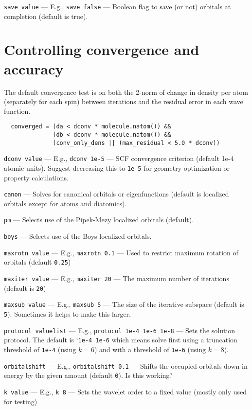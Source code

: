 \documentclass[letterpaper]{book}
\begin{document}
{\tt save value} --- E.g., {\tt save false} --- Boolean flag to save (or not) orbitals at completion (default is true).

\section{Controlling convergence and accuracy}

The default convergence test is on both the 2-norm of change in density per atom (separately for each spin) between iterations and the residual error in each wave function.

\begin{verbatim}
  converged = (da < dconv * molecule.natom()) && 
              (db < dconv * molecule.natom()) &&
              (conv_only_dens || (max_residual < 5.0 * dconv))
\end{verbatim}

{\tt dconv value} --- E.g., {\tt dconv 1e-5} --- SCF convergence criterion (default 1e-4 atomic units).  Suggest decreasing this to {\tt 1e-5} for geometry optimization or property calculations.

{\tt canon} --- Solves for canonical orbitals or eigenfunctions (default is localized orbitals except for atoms and diatomics).

{\tt pm} --- Selects use of the Pipek-Mezy localized orbitals (default).

{\tt boys} --- Selects use of the Boys localized orbitals.

{\tt maxrotn value} --- E.g., {\tt maxrotn 0.1} --- Used to restrict maximum rotation of orbitals (default {\tt 0.25})

{\tt maxiter value} --- E.g., {\tt maxiter 20} --- The maximum number of iterations (default is {\tt 20})

{\tt maxsub value} --- E.g., {\tt maxsub 5} --- The size of the iterative subspace (default is {\tt 5}).  Sometimes it helps to make this larger.

{\tt protocol valuelist} --- E.g., {\tt protocol 1e-4 1e-6 1e-8} --- Sets the solution protocol.  The default is `{\tt 1e-4 1e-6} which means solve first using a truncation threshold of {\tt 1e-4} (using $k=6$) and with a threshold of {\tt 1e-6} (using $k=8$).

{\tt orbitalshift} --- E.g., {\tt orbitalshift 0.1} --- Shifts the occupied orbitals down in energy by the given amount (default {\tt 0}).  Is this working?

{\tt k value} --- E.g., {\tt k 8} --- Sets the wavelet order to a fixed value (mostly only used for testing)
\end{document}
